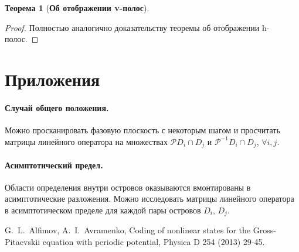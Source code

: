 \documentclass{article}
\newtheorem*{theorem}{Теорема}
\begin{document}
\begin{theorem}[{\bf Об отображении v-полос}]
\end{theorem}

\begin{proof}
	Полностью аналогично доказательству теоремы об отображении h-полос.
\end{proof}

\section*{Приложения}

\paragraph{Случай общего положения.} 

Можно просканировать фазовую плоскость с некоторым шагом и просчитать матрицы линейного оператора на множествах $\mathcal{P} D_i \cap D_j$ и $\mathcal{P}^{-1} D_i \cap D_j$, $\forall i, j$.

\paragraph{Асимптотический предел.}

Области определения внутри островов оказываются вмонтированы в асимптотические разложения.
Можно исследовать матрицы линейного оператора в асимптотическом пределе для каждой пары островов $D_i$, $D_j$.

\begin{thebibliography}{99}
 G.~L.~Alfimov, A.~I.~Avramenko, Coding of nonlinear states for the Gross-Pitaevskii equation with periodic potential, Physica D 254 (2013) 29-45.
\end{thebibliography}
\end{document}

